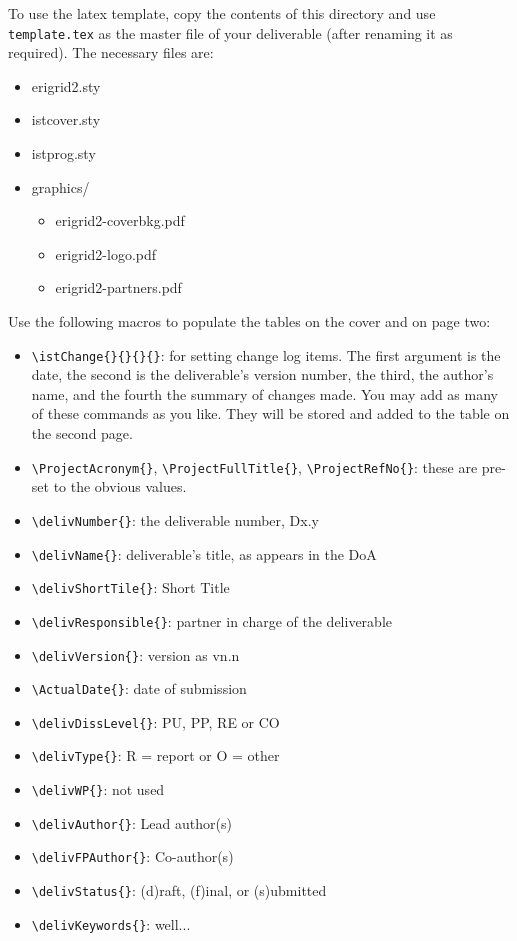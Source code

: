 \newcommand{\macro}[1]{{\tt \textbackslash #1}}

To use the latex template, copy the contents of this directory and use {\tt template.tex} as the master file of your deliverable (after renaming it as required). The necessary files are:

\begin{itemize}
    \item erigrid2.sty
    \item istcover.sty
    \item istprog.sty
    \item graphics/
    \begin{itemize}
        \item erigrid2-coverbkg.pdf
        \item erigrid2-logo.pdf
        \item erigrid2-partners.pdf
    \end{itemize}
\end{itemize}

Use the following macros to populate the tables on the cover and on page two:

\begin{itemize}
    \item \macro{istChange\{\}\{\}\{\}\{\}}: for setting change log items. The first argument is the date, the second is the deliverable's version number, the third, the author's name, and the   fourth the summary of changes made. You may add as many of these   commands as you like. They will be stored and added to the table on   the second page.
    \item \macro{ProjectAcronym\{\}}, \macro{ProjectFullTitle\{\}}, \macro{ProjectRefNo\{\}}: these are pre-set to the obvious values.
    \item \macro{delivNumber\{\}}: the deliverable number, Dx.y
    \item \macro{delivName\{\}}: deliverable's title, as appears in the DoA
    \item \macro{delivShortTile\{\}}: Short Title
    \item \macro{delivResponsible\{\}}: partner in charge of the deliverable
    \item \macro{delivVersion\{\}}: version as vn.n
    \item \macro{ActualDate\{\}}: date of submission
    \item \macro{delivDissLevel\{\}}: PU, PP, RE or CO
    \item \macro{delivType\{\}}: R = report or O = other
    \item \macro{delivWP\{\}}: not used
    \item \macro{delivAuthor\{\}}: Lead author(s)
    \item \macro{delivFPAuthor\{\}}: Co-author(s)
    \item \macro{delivStatus\{\}}: (d)raft, (f)inal, or (s)ubmitted
    \item \macro{delivKeywords\{\}}: well...
\end{itemize}


